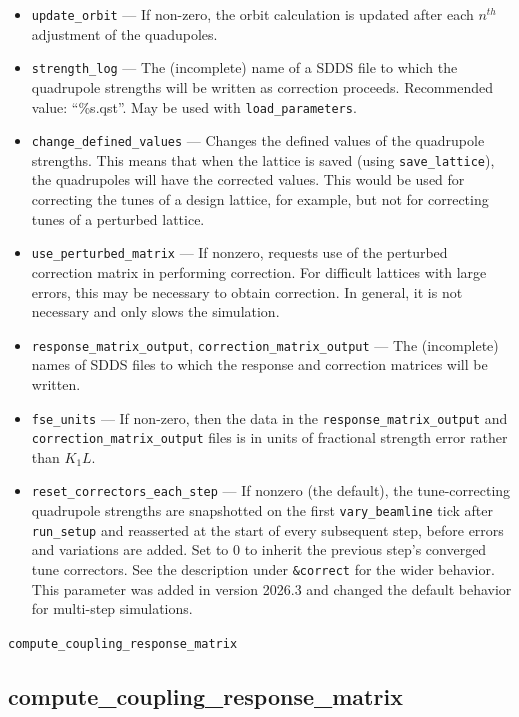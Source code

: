 \documentclass[11pt]{article}
\begin{document}
\begin{itemize}
\item \verb|update_orbit| --- If non-zero, the orbit calculation is updated after each $n^{th}$ adjustment of the
  quadupoles. 
\item \verb|strength_log| --- The (incomplete) name of a SDDS file to which the quadrupole 
strengths will be written as correction proceeds.  Recommended value: ``\%s.qst''.
May be used with \verb|load_parameters|.
\item \verb|change_defined_values| --- Changes the defined values of the quadrupole strengths.
This means that when the lattice is saved (using \verb|save_lattice|), the quadrupoles will
have the corrected values.  This would be used for correcting the tunes of a design
lattice, for example, but not for correcting tunes of a perturbed lattice.
\item \verb|use_perturbed_matrix| --- If nonzero, requests use of the perturbed correction matrix in
performing correction.  For difficult lattices with large errors, this may be necessary
to obtain correction.  In general, it is not necessary and only slows the simulation.
\item \verb|response_matrix_output|, \verb|correction_matrix_output| --- The (incomplete) names of SDDS files
  to which the response and correction matrices will be written. 
\item \verb|fse_units| --- If non-zero, then the data in the  \verb|response_matrix_output| and \verb|correction_matrix_output|
  files is in units of fractional strength error rather than $K_1L$.
\item \verb|reset_correctors_each_step| --- If nonzero (the default), the tune-correcting
  quadrupole strengths are snapshotted on the first \verb|vary_beamline| tick after
  \verb|run_setup| and reasserted at the start of every subsequent step, before
  errors and variations are added.  Set to 0 to inherit the previous step's converged
  tune correctors.  See the description under \verb|&correct| for the wider behavior.
This parameter was added in version 2026.3 and changed the default behavior for multi-step simulations.
\end{itemize}

\newpage
\begin{center}{\Large\verb|compute_coupling_response_matrix|}\end{center}
\subsection{compute\_coupling\_response\_matrix \label{subsec:computecouplingresponsematrix}}
\end{document}
